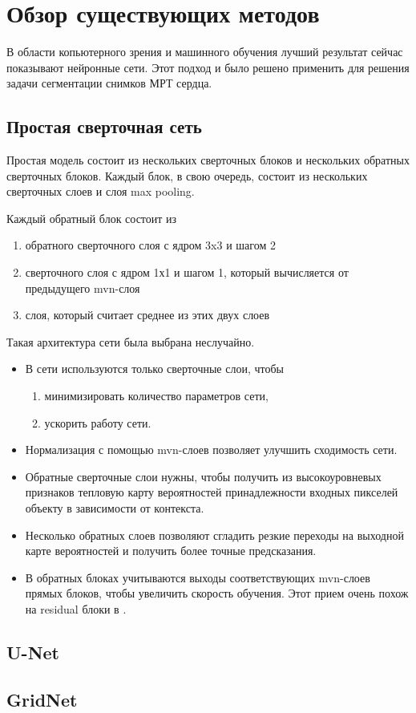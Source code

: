 \section{Обзор существующих методов}

В области копьютерного зрения и машинного обучения лучший результат сейчас показывают нейронные сети. Этот подход и было решено применить для решения задачи сегментации снимков МРТ сердца.

\subsection{Простая сверточная сеть}
 
Простая модель состоит из нескольких сверточных блоков и нескольких обратных сверточных блоков. Каждый блок, в свою очередь, состоит из нескольких сверточных слоев и слоя max pooling. 

Каждый обратный блок состоит из 

\begin{enumerate}
	\item обратного сверточного слоя с ядром 3x3 и шагом 2
	\item сверточного слоя с ядром 1х1 и шагом 1, который вычисляется от предыдущего mvn-слоя
	\item слоя, который считает среднее из этих двух слоев 
\end{enumerate}

Такая архитектура сети была выбрана неслучайно.

\begin{itemize}
	\item В сети используются только сверточные слои, чтобы
	\begin{enumerate}
		\item минимизировать количество параметров сети,
		\item ускорить работу сети.
	\end{enumerate}
	\item Нормализация с помощью mvn-слоев позволяет улучшить сходимость сети.
	\item Обратные сверточные слои нужны, чтобы получить из высокоуровневых признаков тепловую карту вероятностей принадлежности входных пикселей объекту в зависимости от контекста.
	\item Несколько обратных слоев позволяют сгладить резкие переходы на выходной карте вероятностей и получить более точные предсказания.
	\item В обратных блоках учитываются выходы соответствующих mvn-слоев прямых блоков, чтобы увеличить скорость обучения. Этот прием очень похож на residual блоки в \cite{resnet}.
 \end{itemize}

\subsection{U-Net}

\subsection{GridNet}
